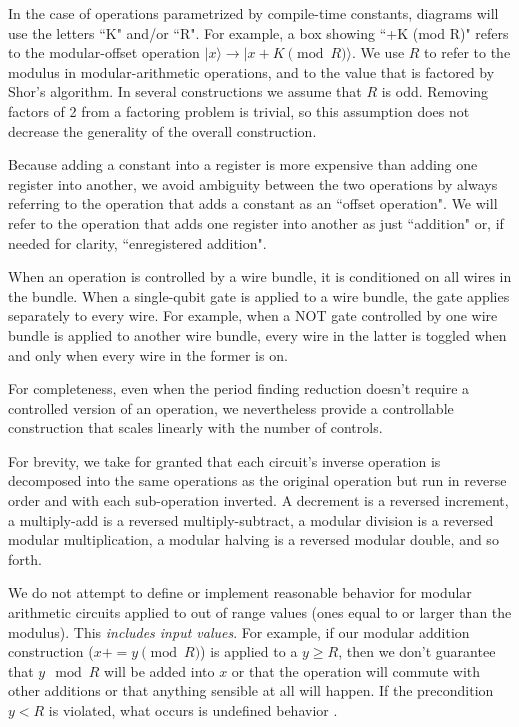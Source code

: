 \documentclass[twocolumn,longbibliography]{quantumarticle}
\begin{document}
In the case of operations parametrized by compile-time constants, diagrams will use the letters ``K" and/or ``R".
For example, a box showing ``+K (mod R)" refers to the modular-offset operation $|x\rangle \rightarrow |x+K \pmod{R}\rangle$.
We use $R$ to refer to the modulus in modular-arithmetic operations, and to the value that is factored by Shor's algorithm.
In several constructions we assume that $R$ is odd.
Removing factors of 2 from a factoring problem is trivial, so this assumption does not decrease the generality of the overall construction.

Because adding a constant into a register is more expensive than adding one register into another, we avoid ambiguity between the two operations by always referring to the operation that adds a constant as an ``offset operation".
We will refer to the operation that adds one register into another as just ``addition" or, if needed for clarity, ``enregistered addition".

When an operation is controlled by a wire bundle, it is conditioned on all wires in the bundle.
When a single-qubit gate is applied to a wire bundle, the gate applies separately to every wire.
For example, when a NOT gate controlled by one wire bundle is applied to another wire bundle, every wire in the latter is toggled when and only when every wire in the former is on.

For completeness, even when the period finding reduction doesn't require a controlled version of an operation, we nevertheless provide a controllable construction that scales linearly with the number of controls.

For brevity, we take for granted that each circuit's inverse operation is decomposed into the same operations as the original operation but run in reverse order and with each sub-operation inverted.
A decrement is a reversed increment, a multiply-add is a reversed multiply-subtract, a modular division is a reversed modular multiplication, a modular halving is a reversed modular double, and so forth.

We do not attempt to define or implement reasonable behavior for modular arithmetic circuits applied to out of range values (ones equal to or larger than the modulus).
This {\em includes input values}.
For example, if our modular addition construction ($x \mathrel{{+}{=}} y \pmod{R}$) is applied to a $y \geq R$, then we don't guarantee that $y \mod R$ will be added into $x$ or that the operation will commute with other additions or that anything sensible at all will happen.
If the precondition $y < R$ is violated, what occurs is undefined behavior \cite{c11}.
\end{document}
